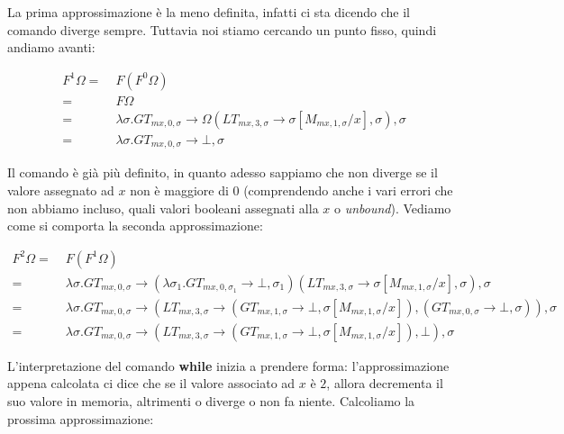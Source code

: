     La prima approssimazione è la meno definita, infatti ci sta dicendo che il comando diverge sempre. Tuttavia noi stiamo cercando un punto fisso, quindi andiamo avanti:
    
    \begin{align*}
        F^1\Omega =\;& F(F^0\Omega)\\
        =\;& F\Omega\\
        =\;& \lambda\sigma. GT_{mx,0,\sigma} \rightarrow \Omega(LT_{mx,3,\sigma}\rightarrow \sigma[M_{mx,1,\sigma}/x], \sigma), \sigma\\
        =\;& \lambda\sigma. GT_{mx,0,\sigma} \rightarrow \bot, \sigma
    \end{align*}
    
    Il comando è già più definito, in quanto adesso sappiamo che non diverge se il valore assegnato ad $x$ non è maggiore di $0$ (comprendendo anche i vari errori che non abbiamo incluso, quali valori booleani assegnati alla $x$ o \textit{unbound}). Vediamo come si comporta la seconda approssimazione:
    
    \begin{align*}
        F^2\Omega =\;& F(F^1\Omega)\\
        =\;& \lambda\sigma. GT_{mx,0,\sigma} \rightarrow (\lambda\sigma_1. GT_{mx,0,\sigma_1} \rightarrow \bot, \sigma_1)(LT_{mx,3,\sigma}\rightarrow \sigma[M_{mx,1,\sigma}/x], \sigma), \sigma\\
        =\;& \lambda\sigma. GT_{mx,0,\sigma} \rightarrow (LT_{mx,3,\sigma}\rightarrow (GT_{mx,1,\sigma} \rightarrow \bot, \sigma[M_{mx,1,\sigma}/x]), (GT_{mx,0,\sigma} \rightarrow \bot, \sigma)), \sigma\\
        =\;& \lambda\sigma. GT_{mx,0,\sigma} \rightarrow (LT_{mx,3,\sigma}\rightarrow (GT_{mx,1,\sigma} \rightarrow \bot, \sigma[M_{mx,1,\sigma}/x]), \bot), \sigma
    \end{align*}
    
    L'interpretazione del comando \textbf{while} inizia a prendere forma: l'approssimazione appena calcolata ci dice che se il valore associato ad $x$ è $2$, allora decrementa il suo valore in memoria, altrimenti o diverge o non fa niente. Calcoliamo la prossima approssimazione:
    
